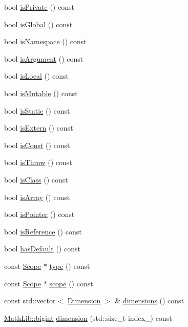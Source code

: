 \begin{DoxyCompactItemize}
bool \hyperlink{class_variable_a7e4749e7ac6bc4a8d835860960943544}{is\-Private} () const 
\item 
bool \hyperlink{class_variable_a9166b90658fafb12bfbf404b9c3349ed}{is\-Global} () const 
\item 
bool \hyperlink{class_variable_af08ebce6ff6615419a82bf5d7161fbe0}{is\-Namespace} () const 
\item 
bool \hyperlink{class_variable_a139c1b51d59cec2781deddf8dd1f38be}{is\-Argument} () const 
\item 
bool \hyperlink{class_variable_ac64624cf9b34652025162b259b4ad82e}{is\-Local} () const 
\item 
bool \hyperlink{class_variable_a28baec65d363f65110dc82e468a56918}{is\-Mutable} () const 
\item 
bool \hyperlink{class_variable_ab349f6cd4976dbc8e849fa3177358ac5}{is\-Static} () const 
\item 
bool \hyperlink{class_variable_a73ce52d39b9ee4f63ccc4621b3948894}{is\-Extern} () const 
\item 
bool \hyperlink{class_variable_afb92c40fbfd8f70be1ef9d14c8169f27}{is\-Const} () const 
\item 
bool \hyperlink{class_variable_a231d07c4f82ecc127e55f569e66103f8}{is\-Throw} () const 
\item 
bool \hyperlink{class_variable_a9dbbb07e2cdb5098f1668b9ec7249787}{is\-Class} () const 
\item 
bool \hyperlink{class_variable_aebf6609f4b1cd477b7bdc6fc7cce4061}{is\-Array} () const 
\item 
bool \hyperlink{class_variable_ad9b045a040f21fbdbc1c2334ff480bed}{is\-Pointer} () const 
\item 
bool \hyperlink{class_variable_a5191a1b0dac4e4dbe17a2c574400e590}{is\-Reference} () const 
\item 
bool \hyperlink{class_variable_a2aef70af4b20e5a006c3ed84c7b9c7da}{has\-Default} () const 
\item 
const \hyperlink{class_scope}{Scope} $\ast$ \hyperlink{class_variable_a90bc01a5698d628a32d37faed36faa34}{type} () const 
\item 
const \hyperlink{class_scope}{Scope} $\ast$ \hyperlink{class_variable_a59036fe67804a365a33444fbe3e0566a}{scope} () const 
\item 
const std\-::vector$<$ \hyperlink{struct_dimension}{Dimension} $>$ \& \hyperlink{class_variable_ad0b805182957510d71786c2f1b4fe80d}{dimensions} () const 
\item 
\hyperlink{class_math_lib_aea370b3be964c5704b6244d757fcac99}{Math\-Lib\-::bigint} \hyperlink{class_variable_a7099e8f2ba4a320d661d9dbc05a88c2a}{dimension} (std\-::size\-\_\-t index\-\_\-) const 
\end{DoxyCompactItemize}


